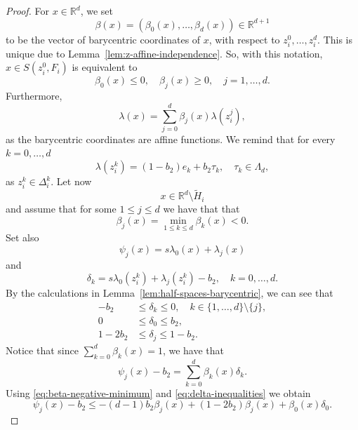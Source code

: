 \documentclass[10pt]{amsart}
\newcommand{\1}{\textbf{1}}
\numberwithin{equation}{section} %
\theoremstyle{remark}
\theoremstyle{definition}
\begin{document}
\begin{proof}
    For $x \in \mathbb{R}^{d}$, we set \[\beta(x)=(\beta_0(x),\ldots,\beta_d(x)) \in \mathbb{R}^{d+1}\] to be the vector of barycentric coordinates of $x$, with respect to $z_i^0,\ldots,z_i^d$. This is unique due to Lemma~\ref{lem:z-affine-independence}. So, with this notation, $x \in S(z_i^0,F_i)$ is equivalent to \begin{equation}\label{eq:shadow-barycentric}\beta_0(x) \leq 0, \quad \beta_j(x) \geq 0, \quad j=1,\ldots,d.\end{equation} Furthermore, \begin{equation}\label{eq:barycentric-mixture}
    \lambda(x)=\sum_{j=0}^{d}\beta_j(x)\lambda(z_i^j),
    \end{equation}
    as the barycentric coordinates are affine functions. We remind that for every $k=0,\ldots, d$\[\lambda(z_i^k)=(1-b_2)e_k+b_2\tau_k, \quad \tau_k \in \Lambda_d,\] as $z_i^k \in \Delta_i^k$. Let now  \[x \in\mathbb{R}^d \setminus \widetilde{H}_i\] and assume that for some $1 \leq j \leq d$ we have that that \begin{equation}\label{eq:beta-negative-minimum}
    \beta_j(x)= \min_{1 \leq k \leq d} \beta_k(x)<0.
    \end{equation}
    Set also \[\psi_j(x)=s\lambda_0(x)+\lambda_j(x)\] and \[\delta_k=s\lambda_0(z_i^k)+\lambda_j(z_i^k)-b_2, \quad k=0,\ldots,d.\] By the calculations in Lemma~\ref{lem:half-spaces-barycentric}, we can see that
    \begin{equation}\label{eq:delta-inequalities}
    \begin{aligned}        
-b_2 &\leq \delta_k \leq 0, \quad k \in \{1,\ldots,d\}\setminus\{j\},\\
 0&\leq \delta_0 \leq b_2,\\
 1-2b_2& \leq \delta_j \leq 1-b_2.
\end{aligned}
\end{equation}
Notice that since $\sum_{k=0}^{d} \beta_k(x)=1$, we have that \[\psi_j(x)-b_2=\sum_{k=0}^d \beta_k(x)\delta_k .\] Using \eqref{eq:beta-negative-minimum} and \eqref{eq:delta-inequalities} we obtain \begin{equation}\label{eq:phi-upper-bound}
    \psi_j(x)-b_2 \leq -(d-1)b_2\beta_j(x)+(1-2b_2)\beta_j(x)+\beta_0(x)\delta_0.
\end{equation}


\end{proof}
\end{document}
